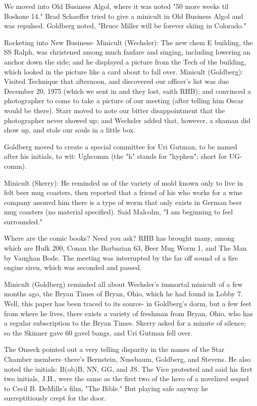 \documentclass[12pt]{article}
\begin{document}
We moved into Old Business Algol, where it was noted "50 more weeks til Boskone 14." Brad Schaeffer tried to give a minicult in Old Business Algol and was repulsed. Goldberg noted, "Bruce Miller will be forever skiing in Colorado."

Rocketing into New Business- Minicult (Wechsler): The new chem E building, the SS Ralph, was christened among much fanfare and singing, including lowering an anchor down the side; and he displayed a picture from the Tech of the building, which looked in the picture like a card about to fall over. Minicult (Goldberg): Visited Technique that afternoon, and discovered our officer's list was due December 20, 1975 (which we sent in and they lost, saith RHB); and convinced a photographer to come to take a picture of our meeting (after telling him Oscar would be there). Starr moved to note our bitter disappointment that the photographer never showed up; and Wechsler added that, however, a shaman did show up, and stole our souls in a little box.

Goldberg moved to create a special committee for Uri Gutman,
to be named after his initials, to wit: Ughcomm (the "h" stands for "hyphen"; short for UG-comm).

Minicult (Skerry): He reminded us of the variety of mold known only to live in felt beer mug coasters, then reported that a friend of his who works for a wine company assured him there is a type of worm that only exists in German beer mug coasters (no material specified). Said Malcolm, "I am beginning to feel surrounded."

Where are the comic books? Need you ask? RHB has brought many, among which are Hulk 200, Conan the Barbarian 63, Beer Mug Worm 1, and The Man by Vaughan Bode. The meeting was interrupted by the far off sound of a fire engine siren, which was seconded and passed.

Minicult (Goldberg) reminded all about Wechsler's immortal minicult of a few months ago, the Bryan Times of Bryan, Ohio, which he had found in Lobby 7. Well, this paper has been traced to its source- in Goldberg's dorm, but a few feet from where he lives, there exists a variety of freshman from Bryan, Ohio, who has a regular subscription to the Bryan Times. Skerry asked for a minute of silence; so the Skinner gave 60 gavel bangs, and Uri Gutman fell over.

The Onseck pointed out a very telling disparity in the names of the Star Chamber members--there's Bernstein, Nussbaum, Goldberg, and Stevens. He also noted the initials: B(ob)B, NN, GG, and JS. The Vice protested and said his first two initials, J.H., were the same as the first two of the hero of a novelized sequel to Cecil B. DeMille's film, "The Bible." But playing safe anyway he surreptitiously crept for the door.
\end{document}
